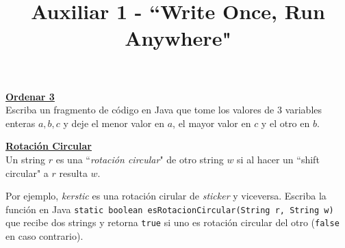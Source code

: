 \documentclass[dcc,uchile]{fcfmcourse}
\title{Auxiliar 1 - ``Write Once, Run Anywhere"}
\begin{document}
\maketitle

\vspace{-1ex}


\begin{problems}

\problem \underline{\textbf{Ordenar 3}}\\
Escriba un fragmento de código en Java que tome los valores de 3 variables enteras $a, b, c$ y deje el menor valor en $a$, el mayor valor en $c$ y el otro en $b$.

\problem \underline{\textbf{Rotación Circular}}\\
Un string $r$ es una ``\textit{rotación circular}" de otro string $w$ si al hacer un ``shift circular" a $r$ resulta $w$.

Por ejemplo, \textit{kerstic} es una rotación cirular de \textit{sticker} y viceversa. 
Escriba la función en Java \texttt{static boolean esRotacionCircular(String r, String w)} que recibe dos strings y retorna \texttt{true} si uno es rotación circular del otro (\texttt{false} en caso contrario).






\end{problems}
\end{document}
